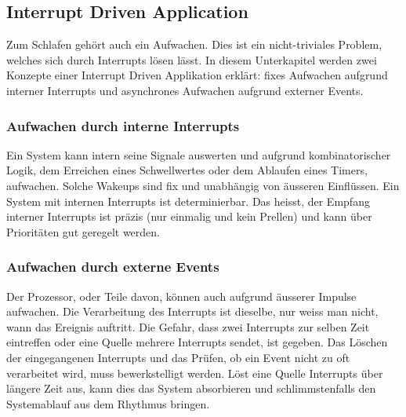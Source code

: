 \subsection{Interrupt Driven Application}\label{pm_interrupt}

Zum Schlafen gehört auch ein Aufwachen. Dies ist ein nicht-triviales Problem, welches sich durch Interrupts lösen lässt. In diesem Unterkapitel werden zwei Konzepte einer Interrupt Driven Applikation erklärt: fixes Aufwachen aufgrund interner Interrupts und asynchrones Aufwachen aufgrund externer Events.

\subsubsection{Aufwachen durch interne Interrupts}

Ein System kann intern seine Signale auswerten und aufgrund kombinatorischer Logik, dem Erreichen eines Schwellwertes oder dem Ablaufen eines Timers, aufwachen. Solche Wakeups sind fix und unabhängig von äusseren Einflüssen. Ein System mit internen Interrupts ist determinierbar. Das heisst, der Empfang interner Interrupts ist präzis (nur einmalig und kein Prellen) und kann über Prioritäten gut geregelt werden.

\subsubsection{Aufwachen durch externe Events}

Der Prozessor, oder Teile davon, können auch aufgrund äusserer Impulse aufwachen. Die Verarbeitung des Interrupts ist dieselbe, nur weiss man nicht, wann das Ereignis auftritt. Die Gefahr, dass zwei Interrupts zur selben Zeit eintreffen oder eine Quelle mehrere Interrupts sendet, ist gegeben. Das Löschen der eingegangenen Interrupts und das Prüfen, ob ein Event nicht zu oft verarbeitet wird, muss bewerkstelligt werden. Löst eine Quelle Interrupts über längere Zeit aus, kann dies das System absorbieren und schlimmstenfalls den Systemablauf aus dem Rhythmus bringen.

%

